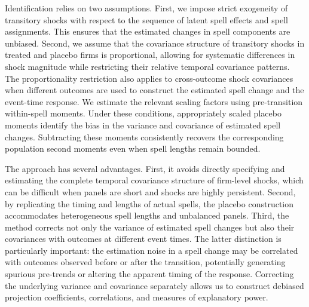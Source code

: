 \documentclass[sigconf,nonacm]{acmart}
\begin{document}
Identification relies on two assumptions. First, we impose strict
exogeneity of transitory shocks with respect to the sequence of latent
spell effects and spell assignments. This ensures that the estimated
changes in spell components are unbiased. Second, we assume that the
covariance structure of transitory shocks in treated and placebo firms
is proportional, allowing for systematic differences in shock magnitude
while restricting their relative temporal covariance patterns. The
proportionality restriction also applies to cross-outcome shock
covariances when different outcomes are used to construct the estimated
spell change and the event-time response. We estimate the relevant
scaling factors using pre-transition within-spell moments. Under these
conditions, appropriately scaled placebo moments identify the bias in
the variance and covariance of estimated spell changes. Subtracting
these moments consistently recovers the corresponding population second
moments even when spell lengths remain bounded.

The approach has several advantages. First, it avoids directly
specifying and estimating the complete temporal covariance structure of
firm-level shocks, which can be difficult when panels are short and
shocks are highly persistent. Second, by replicating the timing and
lengths of actual spells, the placebo construction accommodates
heterogeneous spell lengths and unbalanced panels. Third, the method
corrects not only the variance of estimated spell changes but also their
covariances with outcomes at different event times. The latter
distinction is particularly important: the estimation noise in a spell
change may be correlated with outcomes observed before or after the
transition, potentially generating spurious pre-trends or altering the
apparent timing of the response. Correcting the underlying variance and
covariance separately allows us to construct debiased projection
coefficients, correlations, and measures of explanatory power.

\medskip
\noindent{}
\medskip
\end{document}
